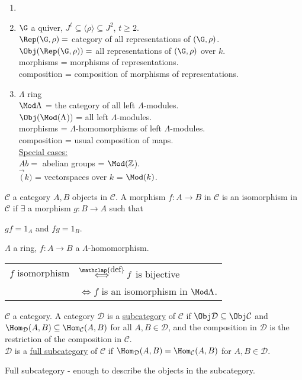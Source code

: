 \begin{exam}
\begin{enumerate}
\item[]
\item $\G$ a quiver, $J^t \subseteq \langle \rho \rangle \subseteq J^2$, $t \geq 2$.\\
$\Rep(\G, \rho) = $ category of all representations of $(\G, \rho)$.\\
$\Obj(\Rep(\G, \rho)) = $ all representations of $(\G, \rho)$ over $k$.\\
morphisms = morphisms of representations.\\
composition = composition of morphisms of representations.

\item $\Lambda$ ring\\
$\Mod\Lambda$ = the category of all left $\Lambda$-modules.\\
$\Obj(\Mod(\Lambda$)) = all left $\Lambda$-modules.\\
morphisms = $\Lambda$-homomorphisms of left $\Lambda$-modules.\\
composition = usual composition of maps.\\
\underline{Special cases:}\\
$Ab = $ abelian groups = $\Mod(\mathbb{Z}$).\\
$\Vec(k)$ = vectorspaces over $k$ = $\Mod(k)$.
\end{enumerate}
\end{exam}

\begin{defin}
$\mathcal{C}$ a category $A,B$ objects in $\mathcal{C}$. A morphism $f:A\to B$ in $\mathcal{C}$ is an isomorphism in $\mathcal{C}$ if $\exists$ a morphism $g:B\to A$ such that\\
\centerline{$gf = 1_A$ and $fg=1_B$.}
\end{defin}
\begin{note}
$\Lambda$ a ring, $f:A\to B$ a $\Lambda$-homomorphism.\\
\begin{tabular}{cl}
$f$ isomorphism & $\stackrel{\mathclap{\normalfont\mbox{def}}}{\iff} f$ is bijective\\
& $\iff f$ is an isomorphism in $\Mod\Lambda$. 
\end{tabular}
\end{note}


\begin{defin}
$\mathcal{C}$ a category. A category $\mathcal{D}$ is a \underline{subcategory} of $\mathcal{C}$ if $\Obj\mathcal{D} \subseteq \Obj\mathcal{C}$ and $\Hom_\mathcal{D}(A,B) \subseteq \Hom_\mathcal{C}(A,B)$ for all $A,B \in \mathcal{D}$, and the composition in $\mathcal{D}$ is the restriction of the composition in $\mathcal{C}$.\\
$\mathcal{D}$ is a \underline{full subcategory} of $\mathcal{C}$ if $\Hom_\mathcal{D}(A,B) = \Hom_\mathcal{C}(A,B)$ for $A,B \in \mathcal{D}$.
\end{defin}
\begin{note}
Full subcategory - enough to describe the objects in the subcategory.
\end{note}

